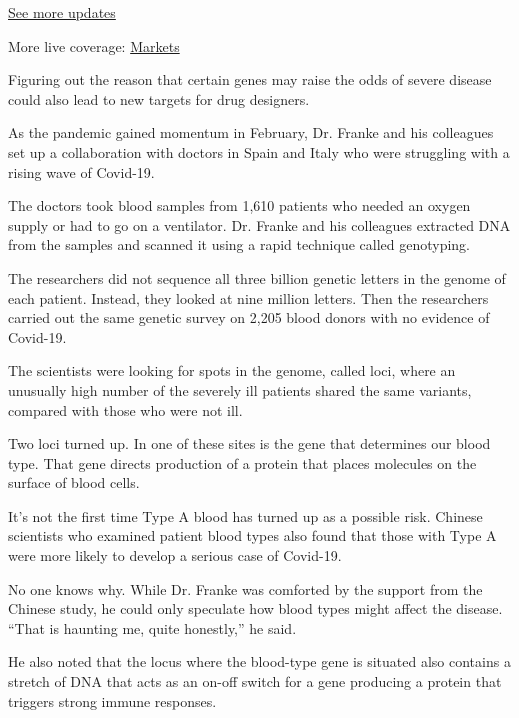 \href{https://www.nytimes3xbfgragh.onion/2020/09/04/world/covid-19-coronavirus.html?action=click\&pgtype=Article\&state=default\&region=MAIN_CONTENT_1\&context=storylines_live_updates}{See
more updates}

More live coverage:
\href{https://www.nytimes3xbfgragh.onion/live/2020/09/04/business/stock-market-today-coronavirus?action=click\&pgtype=Article\&state=default\&region=MAIN_CONTENT_1\&context=storylines_live_updates}{Markets}

Figuring out the reason that certain genes may raise the odds of severe
disease could also lead to new targets for drug designers.

As the pandemic gained momentum in February, Dr. Franke and his
colleagues set up a collaboration with doctors in Spain and Italy who
were struggling with a rising wave of Covid-19.

The doctors took blood samples from 1,610 patients who needed an oxygen
supply or had to go on a ventilator. Dr. Franke and his colleagues
extracted DNA from the samples and scanned it using a rapid technique
called genotyping.

The researchers did not sequence all three billion genetic letters in
the genome of each patient. Instead, they looked at nine million
letters. Then the researchers carried out the same genetic survey on
2,205 blood donors with no evidence of Covid-19.

The scientists were looking for spots in the genome, called loci, where
an unusually high number of the severely ill patients shared the same
variants, compared with those who were not ill.

Two loci turned up. In one of these sites is the gene that determines
our blood type. That gene directs production of a protein that places
molecules on the surface of blood cells.

It's not the first time Type A blood has turned up as a possible risk.
Chinese scientists who examined patient blood types also found that
those with Type A were more likely to develop a serious case of
Covid-19.

No one knows why. While Dr. Franke was comforted by the support from the
Chinese study, he could only speculate how blood types might affect the
disease. ``That is haunting me, quite honestly,'' he said.

He also noted that the locus where the blood-type gene is situated also
contains a stretch of DNA that acts as an on-off switch for a gene
producing a protein that triggers strong immune responses.

